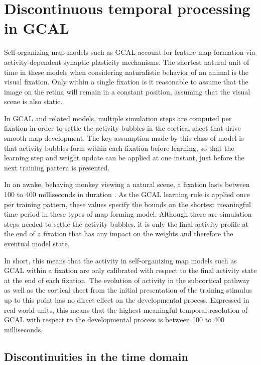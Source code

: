 \documentclass[phd,ianc,twoside]{infthesis}
\begin{document}
\section{Discontinuous temporal processing in GCAL}

Self-organizing map models such as GCAL account for feature map
formation via activity-dependent synaptic plasticity mechanisms. The
shortest natural unit of time in these models when considering
naturalistic behavior of an animal is the visual fixation. Only within a
single fixation is it reasonable to assume that the image on the retina
will remain in a constant position, assuming that the visual scene is
also static.

In GCAL and related models, multiple simulation steps are computed per
fixation in order to settle the activity bubbles in the cortical
sheet that drive smooth map development. The key assumption made by this
class of model is that activity bubbles form within each fixation
before learning, so that the learning step and weight update can be
applied at one instant, just before the next training pattern is presented.

In an awake, behaving monkey viewing a natural scene, a fixation lasts
between 100 to 400 milliseconds in duration
\citep{gallant_neuroreport98}. As the GCAL learning rule is applied once per
training pattern, these values specify the bounds on the shortest
meaningful time period in these types of map forming model. Although
there are simulation steps needed to settle the activity bubbles, it is
only the final activity profile at the end of a fixation that has any
impact on the weights and therefore the eventual model state.

In short, this means that the activity in self-organizing map models
such as GCAL within a fixation are only calibrated with respect to the
final activity state at the end of each fixation. The evolution of
activity in the subcortical pathway as well as the cortical sheet from
the initial presentation of the training stimulus up to this point has
no direct effect on the developmental process. Expressed in real world units,
this means that the highest meaningful temporal resolution of GCAL
with respect to the developmental process is between 100 to 400 milliseconds.

\subsection{Discontinuities in the time domain}
\end{document}
